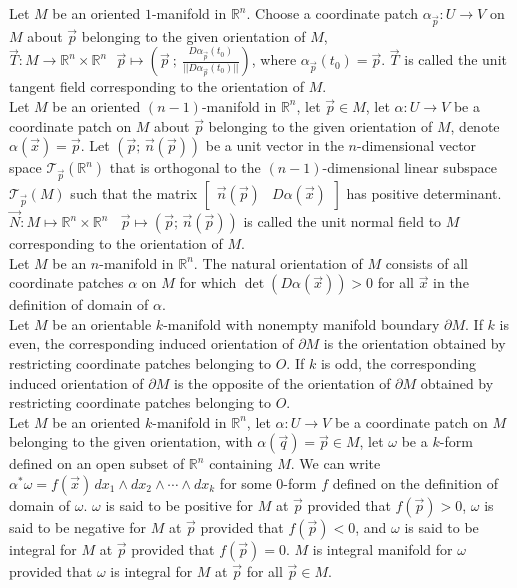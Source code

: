 \documentclass[9pt]{article}
\theoremstyle{break}
\theoremstyle{break}
\newcommand{\R}{\mathbb{R}}
\newcommand{\T}{\mathcal{T}}
\newcommand{\bmat}[1]{\begin{bmatrix} #1 \end{bmatrix}}
\begin{document}
Let $M$ be an oriented $1$-manifold in $\R^n$. Choose a coordinate patch $\alpha_{\vec{p}} :U \to V$ on $M$ about $\vec{p}$ belonging to the given orientation of $M$, $\vec{T}:M \to \R^n\times \R^n \ \ \ \vec{p}\mapsto (\vec{p}\ ;\ \frac{D\alpha_{\vec{p}}(t_0)}{||D\alpha_{\vec{p}}(t_0)||})$, where $\alpha_{\vec{p}}(t_0 ) = \vec{p}$. $\vec{T}$ is called the unit tangent field corresponding to the orientation of $M$.\\

Let $M$ be an oriented $(n-1)$-manifold in $\R^n$, let $\vec{p} \in M$, let $\alpha:U \to V$ be a coordinate patch on $M$ about $\vec{p}$ belonging to the given orientation of $M$, denote $\alpha(\vec{x}) = \vec{p}$. Let $(\vec{p};\, \vec{n}(\vec{p}))$ be a unit vector in the $n$-dimensional vector space $\T_{\vec{p}}(\R^n)$ that is orthogonal to the $(n-1)$-dimensional linear subspace $\T_{\vec{p}}(M)$ such that the matrix $\bmat{\vec{n}(\vec{p})& D\alpha(\vec{x})}$ has positive determinant.  $\vec{N}:M \mapsto \R^n\times \R^n \ \ \ \ \vec{p}\mapsto (\vec{p};\, \vec{n}(\vec{p}))$ is called the unit normal field to $M$ corresponding to the orientation of $M$.\\

Let $M$ be an $n$-manifold in $\R^n$. The natural orientation of $M$ consists of all coordinate patches $\alpha$ on $M$ for which $\det(D\alpha(\vec{x})) >0$ for all $\vec{x}$ in the definition of domain of $\alpha$.\\

Let $M$ be an orientable $k$-manifold with nonempty manifold boundary $\partial M$. If $k$ is even, the corresponding induced orientation of $\partial M$ is the orientation obtained by restricting coordinate patches belonging to $O$. If $k$ is odd, the corresponding induced orientation of $\partial M$ is the opposite of the orientation of $\partial M$ obtained by restricting coordinate patches belonging to $O$.\\

Let $M$ be an oriented $k$-manifold in $\R^n$, let $\alpha: U \to V$ be a coordinate patch on $M$ belonging to the given orientation, with $\alpha(\vec{q}) = \vec{p} \in M$, let $\omega$ be a $k$-form defined on an open subset of $\R^n$ containing $M$. We can write $\alpha^*\omega = f(\vec{x}) \, dx_1 \wedge dx_2 \wedge \cdots \wedge dx_k$ for some $0$-form $f$ defined on the definition of domain of $\omega$. $\omega$ is said to be positive for $M$ at $\vec{p}$ provided that $f(\vec{p})>0$, $\omega$ is said to be negative for $M$ at $\vec{p}$ provided that $f(\vec{p})<0$, and $\omega$ is said to be integral for $M$ at $\vec{p}$ provided that $f(\vec{p})=0$. $M$ is integral manifold for $\omega$ provided that $\omega$ is integral for $M$ at $\vec{p}$ for all $\vec{p}\in M$.
\end{document}
